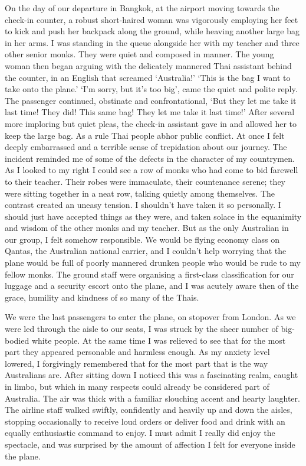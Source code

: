 On the day of our departure in Bangkok, at the airport moving towards
the check-in counter, a robust short-haired woman was vigorously
employing her feet to kick and push her backpack along the ground, while
heaving another large bag in her arms. I was standing in the queue
alongside her with my teacher and three other senior monks. They were
quiet and composed in manner. The young woman then began arguing with
the delicately mannered Thai assistant behind the counter, in an English
that screamed `Australia!' `This is the bag I want to take onto the
plane.' `I'm sorry, but it's too big', came the quiet and polite reply.
The passenger continued, obstinate and confrontational, `But they let me
take it last time! They did! This same bag! They let me take it last
time!' After several more imploring but quiet pleas, the check-in
assistant gave in and allowed her to keep the large bag. As a rule Thai
people abhor public conflict. At once I felt deeply embarrassed and a
terrible sense of trepidation about our journey. The incident reminded
me of some of the defects in the character of my countrymen. As I looked
to my right I could see a row of monks who had come to bid farewell to
their teacher. Their robes were immaculate, their countenance serene;
they were sitting together in a neat row, talking quietly among
themselves. The contrast created an uneasy tension. I shouldn't have
taken it so personally. I should just have accepted things as they were,
and taken solace in the equanimity and wisdom of the other monks and my
teacher. But as the only Australian in our group, I felt somehow
responsible. We would be flying economy class on Qantas, the Australian
national carrier, and I couldn't help worrying that the plane would be
full of poorly mannered drunken people who would be rude to my fellow
monks. The ground staff were organising a first-class classification for
our luggage and a security escort onto the plane, and I was acutely
aware then of the grace, humility and kindness of so many of the Thais.

We were the last passengers to enter the plane, on stopover from London.
As we were led through the aisle to our seats, I was struck by the sheer
number of big-bodied white people. At the same time I was relieved to
see that for the most part they appeared personable and harmless enough.
As my anxiety level lowered, I forgivingly remembered that for the most
part that is the way Australians are. After sitting down I noticed this
was a fascinating realm, caught in limbo, but which in many respects
could already be considered part of Australia. The air was thick with a
familiar slouching accent and hearty laughter. The airline staff walked
swiftly, confidently and heavily up and down the aisles, stopping
occasionally to receive loud orders or deliver food and drink with an
equally enthusiastic command to enjoy. I must admit I really did enjoy
the spectacle, and was surprised by the amount of affection I felt for
everyone inside the plane.

